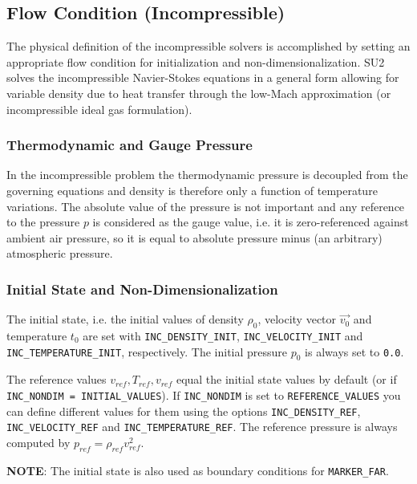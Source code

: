\documentclass[12pt, a4paper, twoside]{article}
\begin{document}
\subsection{Flow Condition (Incompressible)}

The physical definition of the incompressible solvers is accomplished by setting an appropriate flow condition for initialization and non-dimensionalization. SU2 solves the incompressible Navier-Stokes equations in a general form allowing for variable density due to heat transfer through the low-Mach approximation (or incompressible ideal gas formulation).
\subsubsection{Thermodynamic and Gauge Pressure}

In the incompressible problem the thermodynamic pressure is decoupled from the governing equations and density is therefore only a function of temperature variations. The absolute value of the pressure is not important and any reference to the pressure \(p\) is considered as the gauge value, i.e. it is zero-referenced against ambient air pressure, so it is equal to absolute pressure minus (an arbitrary) atmospheric pressure.

\subsubsection{Initial State and Non-Dimensionalization}

The initial state, i.e. the initial values of density \(\rho_0\), velocity vector \(\overrightarrow{v_0}\) and temperature \(t_0\) are set with \verb|INC_DENSITY_INIT|, \verb|INC_VELOCITY_INIT| and \\ \verb|INC_TEMPERATURE_INIT|, respectively. The initial pressure \(p_0\) is always set to \verb|0.0|.

The reference values \(v_{ref}, T_{ref}, v_{ref}\) equal the initial state values by default (or if \texttt{INC\_NONDIM = INITIAL\_VALUES}). If \verb|INC_NONDIM| is set to \verb|REFERENCE_VALUES| you can define different values for them using the options \verb|INC_DENSITY_REF|, \verb|INC_VELOCITY_REF| and \verb|INC_TEMPERATURE_REF|. The reference pressure is always computed by \(p_{ref} = \rho_{ref}v_{ref}^2\).\\
\vspace{.1em}

\textbf{NOTE}: The initial state is also used as boundary conditions for \verb|MARKER_FAR|.
\end{document}

